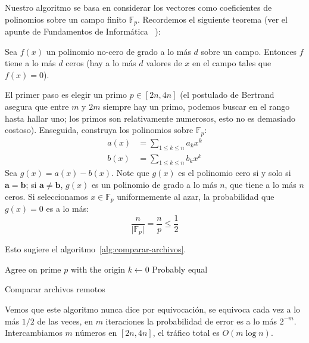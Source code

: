   Nuestro algoritmo se basa en considerar los vectores
  como coeficientes de polinomios sobre un campo finito \(\mathbb{F}_p\).
  Recordemos el siguiente teorema
  (ver el apunte de Fundamentos de Informática~%
    \cite[sección~9.3]{brand17:_fundamentos_informatica}):
  \begin{theorem}
    Sea \(f(x)\) un polinomio no-cero de grado a lo más \(d\)
    sobre un campo.
    Entonces \(f\) tiene a lo más \(d\) ceros
    (hay a lo más \(d\) valores de \(x\) en el campo tales que \(f(x) = 0\)).
  \end{theorem}
  El primer paso es elegir un primo \(p \in [2 n, 4 n]\)
  (el postulado de Bertrand~%
     \cite{erdos30:_beweis_satz_tschebyschef}
   asegura que entre \(m\) y \(2 m\) siempre hay un primo,
   podemos buscar en el rango hasta hallar uno;
   los primos son relativamente numerosos,
   esto no es demasiado costoso).
  Enseguida,
  construya los polinomios sobre \(\mathbb{F}_p\):
  \begin{align*}
    a(x)
      &= \sum_{1 \le k \le n} a_k x^k \\
    b(x)
      &= \sum_{1 \le k \le n} b_k x^k
  \end{align*}
  Sea \(g(x) = a(x) - b(x)\).
  Note que \(g(x)\) es el polinomio cero
  si y solo si \(\mathbf{a} = \mathbf{b}\);
  si \(\mathbf{a} \ne \mathbf{b}\),
  \(g(x)\) es un polinomio de grado a lo más \(n\),
  que tiene a lo más \(n\) ceros.
  Si seleccionamos \(x \in \mathbb{F}_p\) uniformemente al azar,
  la probabilidad que \(g(x) = 0\) es a lo más:
  \begin{equation*}
    \frac{n}{\lvert \mathbb{F}_p \rvert}
      = \frac{n}{p}
      \le \frac{1}{2}
  \end{equation*}

  Esto sugiere el algoritmo~\ref{alg:comparar-archivos}.
  \begin{algorithm}[ht]
    \DontPrintSemicolon\Indp

    Agree on prime \(p\) with the origin \;
    \(k \gets 0\) \;
    \Return Probably equal \;
    \caption{Comparar archivos remotos}
    \label{alg:comparar-archivos}
  \end{algorithm}

  Vemos que este algoritmo nunca dice  por equivocación,
  se equivoca cada vez a lo más \(1/2\) de las veces,
  en \(m\) iteraciones la probabilidad de error es a lo más \(2^{-m}\).
  Intercambiamos \(m\) números en \([2 n, 4 n]\),
  el tráfico total es \(O(m \log n)\).

